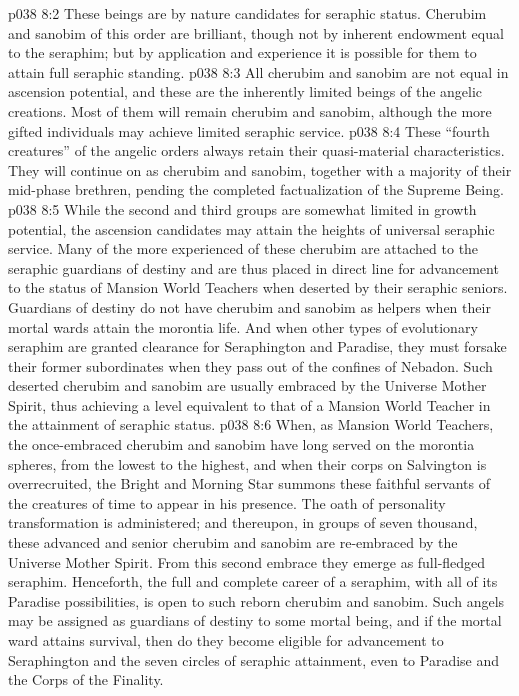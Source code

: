 \pc \vs p038 8:2 \bibnobreakspace {} These beings are by nature candidates for seraphic status. Cherubim and sanobim of this order are brilliant, though not by inherent endowment equal to the seraphim; but by application and experience it is possible for them to attain full seraphic standing.
\pc \vs p038 8:3 \bibnobreakspace {} All cherubim and sanobim are not equal in ascension potential, and these are the inherently limited beings of the angelic creations. Most of them will remain cherubim and sanobim, although the more gifted individuals may achieve limited seraphic service.
\pc \vs p038 8:4 \bibnobreakspace {} These “fourth creatures” of the angelic orders always retain their quasi\hyp{}material characteristics. They will continue on as cherubim and sanobim, together with a majority of their mid\hyp{}phase brethren, pending the completed factualization of the Supreme Being.
\pc \vs p038 8:5 While the second and third groups are somewhat limited in growth potential, the ascension candidates may attain the heights of universal seraphic service. Many of the more experienced of these cherubim are attached to the seraphic guardians of destiny and are thus placed in direct line for advancement to the status of Mansion World Teachers when deserted by their seraphic seniors. Guardians of destiny do not have cherubim and sanobim as helpers when their mortal wards attain the morontia life. And when other types of evolutionary seraphim are granted clearance for Seraphington and Paradise, they must forsake their former subordinates when they pass out of the confines of Nebadon. Such deserted cherubim and sanobim are usually embraced by the Universe Mother Spirit, thus achieving a level equivalent to that of a Mansion World Teacher in the attainment of seraphic status.\plusone
\vs p038 8:6 When, as Mansion World Teachers, the once\hyp{}embraced cherubim and sanobim have long served on the morontia spheres, from the lowest to the highest, and when their corps on Salvington is overrecruited, the Bright and Morning Star summons these faithful servants of the creatures of time to appear in his presence. The oath of personality transformation is administered; and thereupon, in groups of seven thousand, these advanced and senior cherubim and sanobim are re\hyp{}embraced by the Universe Mother Spirit. From this second embrace they emerge as full\hyp{}fledged seraphim. Henceforth, the full and complete career of a seraphim, with all of its Paradise possibilities, is open to such reborn cherubim and sanobim. Such angels may be assigned as guardians of destiny to some mortal being, and if the mortal ward attains survival, then do they become eligible for advancement to Seraphington and the seven circles of seraphic attainment, even to Paradise and the Corps of the Finality.

